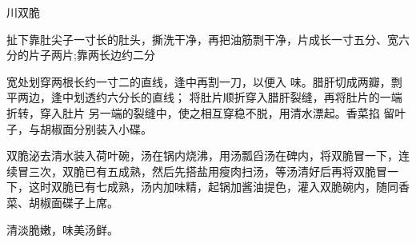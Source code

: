 \begin{recipe}{川双脆}

\ingredients


\cooking

\step 扯下靠肚尖子一寸长的肚头，撕洗干净，再把油筋剽干净，片成长一寸五分、宽六分的片子两片;靠两长边约二分

宽处划穿两根长约一寸二的直线，逢中再割一刀，以便入 味。腊肝切成两瓣，剽平两边，逢中划透约六分长的直线； 将肚片顺折穿入腊肝裂缝，再将肚片的一端折转，穿入肚片 另一端的裂缝中，使之相互穿稳不脱，用清水漂起。香菜掐 留叶子，与胡椒面分别装入小碟。

\step 双脆泌去清水装入荷叶碗，汤在锅内烧沸，用汤瓢舀汤在碑内，将双脆冒一下，连续冒三次，双脆已有五成熟，然后先搭盐用瘦肉扫汤，等汤清好后再将双脆冒一下，这时双脆已有七成熟，汤内加味精，起锅加酱油提色，灌入双脆碗内，随同香菜、胡椒面碟子上席。

\notes

清淡脆嫩，味美汤鲜。

\end{recipe}

